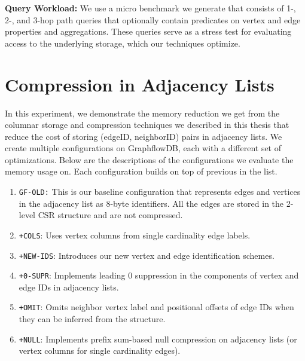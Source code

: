 \noindent \textbf{Query Workload:} We use a micro benchmark we generate that consists of 1-, 2-, and 3-hop path queries that optionally contain predicates on vertex and edge properties and aggregations. These queries serve as a stress test for evaluating access to the underlying storage, which our techniques optimize. 

\section{Compression in Adjacency Lists}
\label{exp:adjacency-list-exp}

In this experiment, we demonstrate the memory reduction we get from the columnar storage and compression techniques we described in this thesis that reduce the cost of storing (edgeID, neighborID) pairs in adjacency lists.%
We create multiple configurations on GraphflowDB, each with a different set of optimizations. Below are the descriptions of the configurations we evaluate the memory usage on. Each configuration builds on top of previous in the list. 

\begin{enumerate}
	\item \texttt{GF-OLD:} This is our baseline configuration that represents edges and vertices in the adjacency list as 8-byte identifiers. All the edges are stored in the 2-level CSR structure and are not compressed.
	\item \texttt{+COLS}: Uses vertex columns from single cardinality edge labels. 
	\item \texttt{+NEW-IDS}: Introduces our new vertex and edge identification schemes.
	\item \texttt{+0-SUPR}: Implements leading 0 suppression in the components of vertex and edge IDs in adjacency lists.
	\item \texttt{+OMIT}: Omits neighbor vertex label and positional offsets of edge IDs when they can be inferred from the structure.
	\item \texttt{+NULL}: Implements prefix sum-based null compression on adjacency lists (or vertex columns for single cardinality edges).
\end{enumerate}

